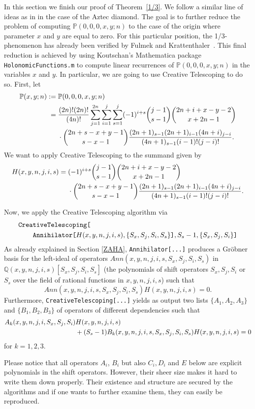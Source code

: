 \documentclass{amsart}
\numberwithin{equation}{section}
\newcommand*{\Q}{\mathbb{Q}}
\begin{document}
In this section we finish our proof of Theorem~\ref{1/3}. We follow a similar line of ideas as in \cite{1/4} in the case of the Aztec diamond. The goal is to further reduce the problem of computing $\mathbb{P}(0,0,0,x,y;n)$ to the case of the origin where  parameter $x$ and $y$ are equal to zero. For this particular position, the 1/3-phenomenon has already been verified by Fulmek and Krattenthaler~\cite[Cor. 7 (1.8)]{CenterCase}.
This final reduction is achieved by using  Koutschan's Mathematica package \texttt{HolonomicFunctions.m} to compute linear recurrences of $\mathbb{P}(0,0,0,x,y;n)$ in the variables $x$ and $y$. In particular, we are going to use Creative Telescoping to do so. First, let
\begin{align}
    \mathbb{P}(x,y;n):={}& \mathbb{P}(0,0,0,x,y;n)\notag\\
    ={}&\frac{(2n)!(2n)!}{(4n)!}\sum_{j=1}^{2n}\sum_{i=1}^{j}\sum_{s=1}^j (-1)^{i+s}\binom{j-1}{s-1}\binom{2n+i+x-y-2}{x+2n-1}\notag\\
    &\cdot \binom{2n+s-x+y-1}{s-x-1}\frac{(2n+1)_{s-1}(2n+1)_{i-1}(4n+i)_{j-i}}{(4n+1)_{s-1}(i-1)!(j-i)!}.\notag
\end{align}
We want to apply Creative Telescoping to the summand given by
\begin{align}
    H(x,y,n,j,i,s)={}&(-1)^{i+s}\binom{j-1}{s-1}\binom{2n+i+x-y-2}{x+2n-1}\notag\\
    &\cdot \binom{2n+s-x+y-1}{s-x-1}\frac{(2n+1)_{s-1}(2n+1)_{i-1}(4n+i)_{j-i}}{(4n+1)_{s-1}(i-1)!(j-i)!}.\notag
\end{align}

Now, we apply the Creative Telescoping algorithm via
\begin{align}
    \texttt{Crea}&\texttt{tiveTelescoping[}\notag\\
    &\texttt{Annihilator[}H(x,y,n,j,i,s),\{S_x,S_j,S_i,S_s\}\texttt{]},S_s-1,\{S_x,S_j,S_i\}\texttt{]}\notag
\end{align}
As already explained in Section \ref{ZAHA}, \texttt{Annihilator[...]} produces a Gröbner basis for the left-ideal of operators $Ann(x,y,n,j,i,s,S_x,S_j,S_i,S_s)$ in $\Q(x,y,n,j,i,s)[S_x,S_j,S_i,S_s]$ (the polynomials of shift operators $S_x,S_j,S_i$ or $S_s$ over the field of rational functions in $x,y,n,j,i,s$) such that
\[Ann(x,y,n,j,i,s,S_x,S_j,S_i,S_s)H(x,y,n,j,i,s)=0.\]
Furthermore, \texttt{CreativeTelescoping[...]} yields as output two lists $\{A_1,A_2,A_3\}$ and $\{B_1,B_2,B_3\}$ of operators of different dependencies such that
\begin{align}
    A_k(x,y,n,j,i,S_x,S_j,S_i)&H(x,y,n,j,i,s)\notag\\
    &{}+(S_s-1)B_k(x,y,n,j,i,s,S_x,S_j,S_i,S_s)H(x,y,n,j,i,s)=0 \label{Tele1}
\end{align}
for $k=1,2,3$. 
\begin{rem}
    Please notice that all operators $A_i$, $B_i$ but also $C_i,D_i$ and $E$ below are explicit polynomials in the shift operators. However, their sheer size makes it hard to write them down properly. Their existence and structure are secured by the algorithms and if one wants to further examine them, they can easily be reproduced. 
\end{rem}
\end{document}
